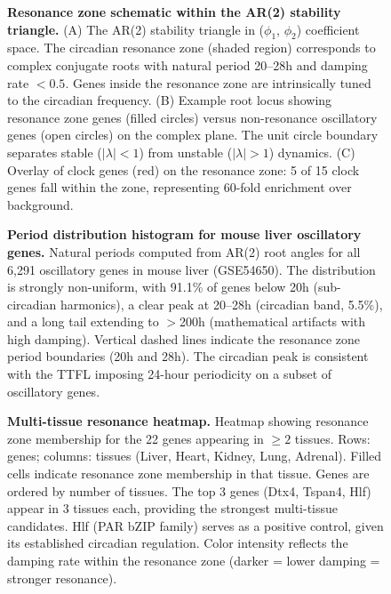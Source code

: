 \documentclass[11pt,letterpaper]{article}
\begin{document}
\begin{figure}[H]
\caption{\textbf{Resonance zone schematic within the AR(2) stability triangle.} (A) The AR(2) stability triangle in ($\phi_1$, $\phi_2$) coefficient space. The circadian resonance zone (shaded region) corresponds to complex conjugate roots with natural period 20--28h and damping rate $< 0.5$. Genes inside the resonance zone are intrinsically tuned to the circadian frequency. (B) Example root locus showing resonance zone genes (filled circles) versus non-resonance oscillatory genes (open circles) on the complex plane. The unit circle boundary separates stable ($|\lambda| < 1$) from unstable ($|\lambda| > 1$) dynamics. (C) Overlay of clock genes (red) on the resonance zone: 5 of 15 clock genes fall within the zone, representing 60-fold enrichment over background.}
\label{fig:resonance_schematic}
\end{figure}

\begin{figure}[H]
\caption{\textbf{Period distribution histogram for mouse liver oscillatory genes.} Natural periods computed from AR(2) root angles for all 6,291 oscillatory genes in mouse liver (GSE54650). The distribution is strongly non-uniform, with 91.1\% of genes below 20h (sub-circadian harmonics), a clear peak at 20--28h (circadian band, 5.5\%), and a long tail extending to $>$200h (mathematical artifacts with high damping). Vertical dashed lines indicate the resonance zone period boundaries (20h and 28h). The circadian peak is consistent with the TTFL imposing 24-hour periodicity on a subset of oscillatory genes.}
\label{fig:period_distribution}
\end{figure}

\begin{figure}[H]
\caption{\textbf{Multi-tissue resonance heatmap.} Heatmap showing resonance zone membership for the 22 genes appearing in $\geq 2$ tissues. Rows: genes; columns: tissues (Liver, Heart, Kidney, Lung, Adrenal). Filled cells indicate resonance zone membership in that tissue. Genes are ordered by number of tissues. The top 3 genes (Dtx4, Tspan4, Hlf) appear in 3 tissues each, providing the strongest multi-tissue candidates. Hlf (PAR bZIP family) serves as a positive control, given its established circadian regulation. Color intensity reflects the damping rate within the resonance zone (darker = lower damping = stronger resonance).}
\label{fig:heatmap}
\end{figure}
\end{document}
